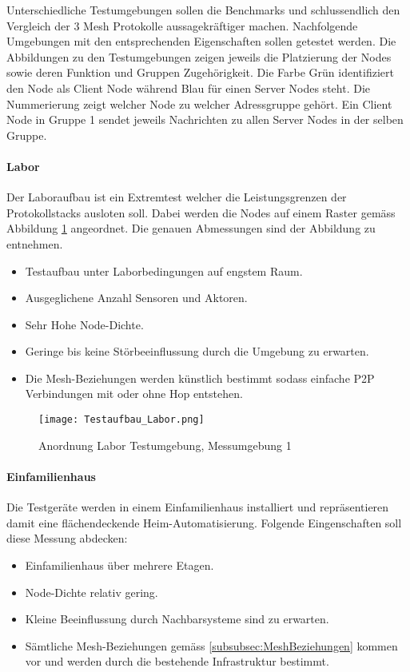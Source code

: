 Unterschiedliche Testumgebungen sollen die Benchmarks und schlussendlich den Vergleich der 3 Mesh Protokolle aussagekräftiger machen.
Nachfolgende Umgebungen mit den entsprechenden Eigenschaften sollen getestet werden.
Die Abbildungen zu den Testumgebungen zeigen jeweils die Platzierung der Nodes sowie deren Funktion und Gruppen Zugehörigkeit. Die Farbe Grün identifiziert den Node als Client Node während Blau für einen Server Nodes steht. Die Nummerierung zeigt welcher Node zu welcher Adressgruppe gehört. Ein Client Node in Gruppe 1 sendet jeweils Nachrichten zu allen Server Nodes in der selben Gruppe.

\paragraph{Labor}
Der Laboraufbau ist ein Extremtest welcher die Leistungsgrenzen der Protokollstacks ausloten soll. Dabei werden die Nodes auf einem Raster gemäss Abbildung \ref{fig:AnordnungLaborTestumgebungMessumgebung1} angeordnet. Die genauen Abmessungen sind der Abbildung zu entnehmen.
\begin{itemize}
	\item Testaufbau unter Laborbedingungen auf engstem Raum.
	\item Ausgeglichene Anzahl Sensoren und Aktoren.
	\item Sehr Hohe Node-Dichte.
	\item Geringe bis keine Störbeeinflussung durch die Umgebung zu  erwarten.
	\item Die Mesh-Beziehungen werden künstlich bestimmt sodass einfache P2P Verbindungen mit oder ohne Hop entstehen.
\end{itemize}


\begin{figure}[H]
\centering
\texttt{[image: Testaufbau\_Labor.png]}
\caption{Anordnung Labor Testumgebung, Messumgebung 1}\label{fig:AnordnungLaborTestumgebungMessumgebung1}
\end{figure}

\paragraph{Einfamilienhaus}
Die Testgeräte werden in einem Einfamilienhaus installiert und repräsentieren damit eine flächendeckende Heim-Automatisierung. Folgende Eingenschaften soll diese Messung abdecken:
\begin{itemize}
	\item Einfamilienhaus über mehrere Etagen.
	\item Node-Dichte relativ gering.
	\item Kleine Beeinflussung durch Nachbarsysteme sind zu erwarten.
	\item Sämtliche Mesh-Beziehungen gemäss \ref{subsubsec:MeshBeziehungen} kommen vor und werden durch die bestehende Infrastruktur bestimmt.
\end{itemize}

